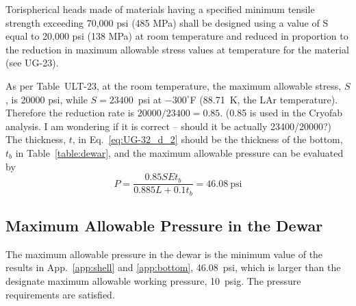 \begin{displayquote}
    Torispherical heads made of materials having a specified minimum 
    tensile strength exceeding 70,000 psi (485 MPa) shall be designed 
    using a value of S equal to 20,000 psi (138 MPa) at room temperature 
    and reduced in proportion to the reduction in maximum allowable 
    stress values at temperature for the material (see UG-23).
\end{displayquote}

As per Table~ULT-23, at the room temperature, the maximum allowable 
stress, $S$, is 20000 psi, 
while $S = 23400$~psi at $-300^{\circ}$F (88.71~K, the LAr temperature). 
Therefore the reduction rate is $20000/23400 = 0.85$.
(0.85 is used in the Cryofab analysis.
I am wondering if it is correct -- should it be actually 23400/20000?)\\

The thickness, $t$, in Eq.~\ref{eq:UG-32_d_2} should be the thickness
of the bottom, $t_b$ in Table~\ref{table:dewar}, and the maximum allowable
pressure can be evaluated by
\begin{equation}
    P = \frac{0.85SEt_b}{0.885L+0.1t_b} = 46.08~\text{psi}
\end{equation}

\subsection{Maximum Allowable Pressure in the Dewar}
\label{app:mawp}

The maximum allowable pressure in the dewar is the minimum value of
the results in App.~\ref{app:shell} and \ref{app:bottom}, 46.08~psi,
which is larger than the designate maximum allowable working pressure,
10~psig.
The pressure requirements are satisfied.

